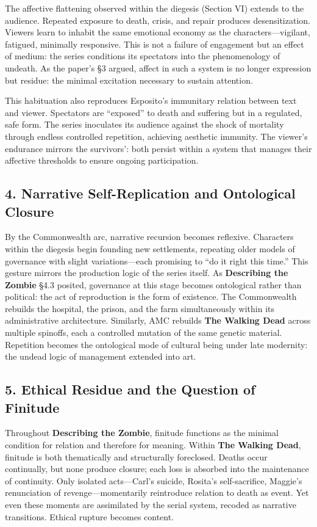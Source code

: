 \documentclass[11pt]{article}
\begin{document}
The affective flattening observed within the diegesis (Section VI) extends to the audience.  Repeated exposure to death, crisis, and repair produces desensitization.  Viewers learn to inhabit the same emotional economy as the characters—vigilant, fatigued, minimally responsive.  This is not a failure of engagement but an effect of medium: the series conditions its spectators into the phenomenology of undeath.  As the paper’s §3 argued, affect in such a system is no longer expression but residue: the minimal excitation necessary to sustain attention.  

This habituation also reproduces Esposito’s immunitary relation between text and viewer.  Spectators are “exposed” to death and suffering but in a regulated, safe form.  The series inoculates its audience against the shock of mortality through endless controlled repetition, achieving aesthetic immunity.  The viewer’s endurance mirrors the survivors’: both persist within a system that manages their affective thresholds to ensure ongoing participation.  
\subsection*{4. Narrative Self-Replication and Ontological Closure}
\label{sec:org3c8c38f}

By the Commonwealth arc, narrative recursion becomes reflexive.  Characters within the diegesis begin founding new settlements, repeating older models of governance with slight variations—each promising to “do it right this time.”  This gesture mirrors the production logic of the series itself.  As \textbf{Describing the Zombie} §4.3 posited, governance at this stage becomes ontological rather than political: the act of reproduction is the form of existence.  The Commonwealth rebuilds the hospital, the prison, and the farm simultaneously within its administrative architecture.  Similarly, AMC rebuilds \textbf{The Walking Dead} across multiple spinoffs, each a controlled mutation of the same genetic material.  Repetition becomes the ontological mode of cultural being under late modernity: the undead logic of management extended into art.
\subsection*{5. Ethical Residue and the Question of Finitude}
\label{sec:orga059adc}

Throughout \textbf{Describing the Zombie}, finitude functions as the minimal condition for relation and therefore for meaning.  Within \textbf{The Walking Dead}, finitude is both thematically and structurally foreclosed.  Deaths occur continually, but none produce closure; each loss is absorbed into the maintenance of continuity.  Only isolated acts—Carl’s suicide, Rosita’s self-sacrifice, Maggie’s renunciation of revenge—momentarily reintroduce relation to death as event.  Yet even these moments are assimilated by the serial system, recoded as narrative transitions.  Ethical rupture becomes content.  
\end{document}
